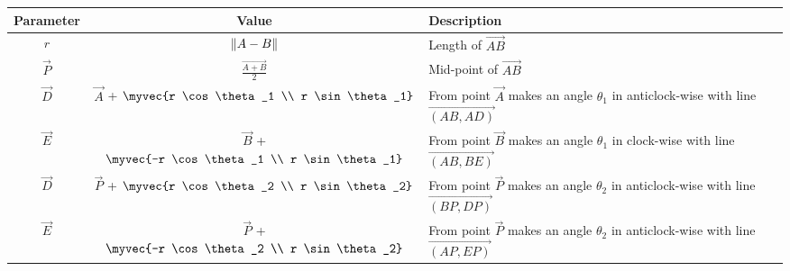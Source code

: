 \begin{tabular}{|c|c|p{5cm}|}
\hline
\textbf{Parameter} & \textbf{Value} & \textbf{Description} \\
\hline
	$r$ & $\lVert A-B\rVert$ & Length of $\vec{AB}$ \\
\hline
	$\vec{P}$ & $\frac{\vec{A+B}}{2}$ & Mid-point of $\vec{AB}$ \\
\hline
	$\vec{D}$ & $\vec{A}$ + $\myvec{r \cos \theta_1  \\ r \sin \theta_1}$ & From point $\vec{A}$ makes an angle $\theta_1$ in anticlock-wise with line $\vec{(AB, AD)}$  \\
\hline
	$\vec{E}$ & $\vec{B}$ + $\myvec{-r \cos \theta_1  \\ r \sin \theta_1}$ & From point $\vec{B}$ makes an angle $\theta_1$ in clock-wise with line $\vec{(AB, BE)}$  \\  
\hline       
	$\vec{D}$ & $\vec{P}$ + $\myvec{r \cos \theta_2  \\ r \sin \theta_2}$ & From point $\vec{P}$ makes an angle $\theta_2$ in anticlock-wise with line $\vec{(BP, DP)}$  \\  
\hline
	$\vec{E}$ & $\vec{P}$ + $\myvec{-r \cos \theta_2  \\ r \sin \theta_2}$ & From point $\vec{P}$ makes an angle $\theta_2$ in anticlock-wise with line $\vec{(AP, EP)}$  \\  
\hline
\end{tabular}
